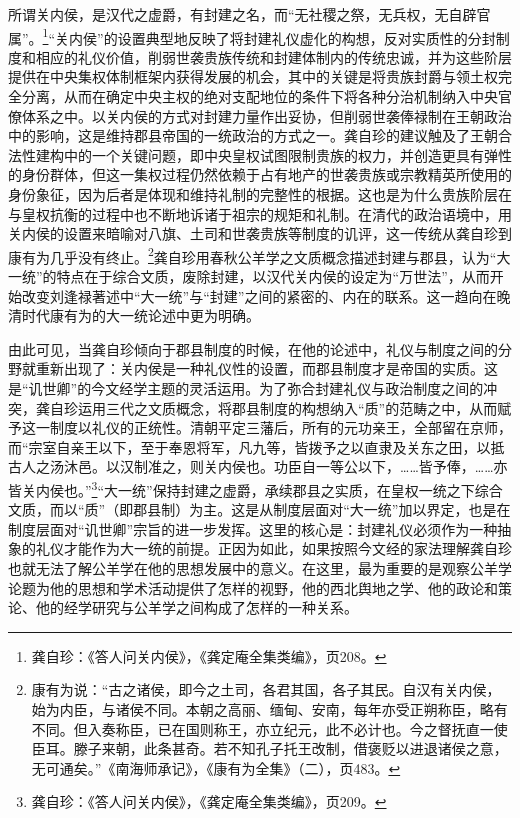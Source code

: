 \documentclass[a4paper, 12pt, openright]{ctexbook}
\begin{document}
所谓关内侯，是汉代之虚爵，有封建之名，而“无社稷之祭，无兵权，无自辟官属”。\footnote{龚自珍：《答人问关内侯》，《龚定庵全集类编》，页208。}“关内侯”的设置典型地反映了将封建礼仪虚化的构想，反对实质性的分封制度和相应的礼仪价值，削弱世袭贵族传统和封建体制内的传统忠诚，并为这些阶层提供在中央集权体制框架内获得发展的机会，其中的关键是将贵族封爵与领土权完全分离，从而在确定中央主权的绝对支配地位的条件下将各种分治机制纳入中央官僚体系之中。以关内侯的方式对封建力量作出妥协，但削弱世袭俸禄制在王朝政治中的影响，这是维持郡县帝国的一统政治的方式之一。龚自珍的建议触及了王朝合法性建构中的一个关键问题，即中央皇权试图限制贵族的权力，并创造更具有弹性的身份群体，但这一集权过程仍然依赖于占有地产的世袭贵族或宗教精英所使用的身份象征，因为后者是体现和维持礼制的完整性的根据。这也是为什么贵族阶层在与皇权抗衡的过程中也不断地诉诸于祖宗的规矩和礼制。在清代的政治语境中，用关内侯的设置来暗喻对八旗、土司和世袭贵族等制度的讥评，这一传统从龚自珍到康有为几乎没有终止。\footnote{康有为说：“古之诸侯，即今之土司，各君其国，各子其民。自汉有关内侯，始为内臣，与诸侯不同。本朝之高丽、缅甸、安南，每年亦受正朔称臣，略有不同。但入奏称臣，已在国则称王，亦立纪元，此不必计也。今之督抚直一使臣耳。滕子来朝，此条甚奇。若不知孔子托王改制，借褒贬以进退诸侯之意，无可通矣。”《南海师承记》，《康有为全集》（二），页483。}龚自珍用春秋公羊学之文质概念描述封建与郡县，认为“大一统”的特点在于综合文质，废除封建，以汉代关内侯的设定为“万世法”，从而开始改变刘逢禄著述中“大一统”与“封建”之间的紧密的、内在的联系。这一趋向在晚清时代康有为的大一统论述中更为明确。

由此可见，当龚自珍倾向于郡县制度的时候，在他的论述中，礼仪与制度之间的分野就重新出现了：关内侯是一种礼仪性的设置，而郡县制度才是帝国的实质。这是“讥世卿”的今文经学主题的灵活运用。为了弥合封建礼仪与政治制度之间的冲突，龚自珍运用三代之文质概念，将郡县制度的构想纳入“质”的范畴之中，从而赋予这一制度以礼仪的正统性。清朝平定三藩后，所有的元功亲王，全部留在京师，而“宗室自亲王以下，至于奉恩将军，凡九等，皆拨予之以直隶及关东之田，以抵古人之汤沐邑。以汉制准之，则关内侯也。功臣自一等公以下，……皆予俸，……亦皆关内侯也。”\footnote{龚自珍：《答人问关内侯》，《龚定庵全集类编》，页209。}“大一统”保持封建之虚爵，承续郡县之实质，在皇权一统之下综合文质，而以“质”（即郡县制）为主。这是从制度层面对“大一统”加以界定，也是在制度层面对“讥世卿”宗旨的进一步发挥。这里的核心是：封建礼仪必须作为一种抽象的礼仪才能作为大一统的前提。正因为如此，如果按照今文经的家法理解龚自珍也就无法了解公羊学在他的思想发展中的意义。在这里，最为重要的是观察公羊学论题为他的思想和学术活动提供了怎样的视野，他的西北舆地之学、他的政论和策论、他的经学研究与公羊学之间构成了怎样的一种关系。
\end{document}
